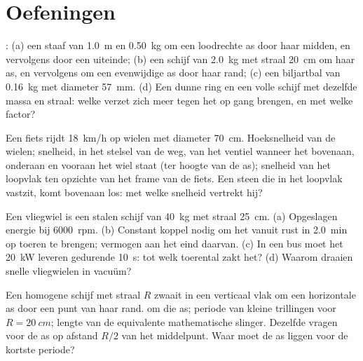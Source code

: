\section{Oefeningen}

\begin{exercise}[$\star$]\label{exo:b2:rigid-body-mechanics:1}
: (a) een staaf van \qty{1.0}{m} en \qty{0.50}{kg} om een
loodrechte as door haar midden, en vervolgens door een uiteinde; (b) een
schijf van \qty{2.0}{kg} met straal \qty{20}{cm} om haar as, en vervolgens
om een evenwijdige as door haar rand; (c) een biljartbal van \qty{0.16}{kg}
met diameter \qty{57}{mm}. (d) Een dunne ring en een volle schijf met
dezelfde massa en straal: welke verzet zich meer tegen het op gang
brengen, en met welke factor?
\end{exercise}

\begin{exercise}[$\star$]\label{exo:b2:rigid-body-mechanics:2}
Een fiets rijdt \qty{18}{km/h} op wielen met diameter \qty{70}{cm}.
Hoeksnelheid van de wielen; snelheid, in het stelsel van de weg, van het
ventiel wanneer het bovenaan, onderaan en vooraan het wiel staat (ter
hoogte van de as); snelheid van het loopvlak ten opzichte van het frame
van de fiets. Een steen die in het loopvlak vastzit, komt bovenaan los:
met welke snelheid vertrekt hij?
\end{exercise}

\begin{exercise}[$\star$]\label{exo:b2:rigid-body-mechanics:3}
Een vliegwiel is een stalen schijf van \qty{40}{kg} met straal \qty{25}{cm}.
(a) Opgeslagen energie bij \qty{6000}{rpm}. (b) Constant koppel nodig om
het vanuit rust in \qty{2.0}{min} op toeren te brengen; vermogen aan het
eind daarvan. (c) In een bus moet het \qty{20}{kW} leveren gedurende
\qty{10}{s}: tot welk toerental zakt het? (d) Waarom draaien snelle
vliegwielen in vacuüm?
\end{exercise}

\begin{exercise}[$\star$]\label{exo:b2:rigid-body-mechanics:4}
Een homogene schijf met straal $R$ zwaait in een verticaal vlak om een
horizontale as door een punt van haar rand.  om die as;
periode van kleine trillingen voor $R = \qty{20}{cm}$; lengte van de
equivalente mathematische slinger. Dezelfde vragen voor de as op afstand
$R/2$ van het middelpunt. Waar moet de as liggen voor de kortste periode?
\end{exercise}

